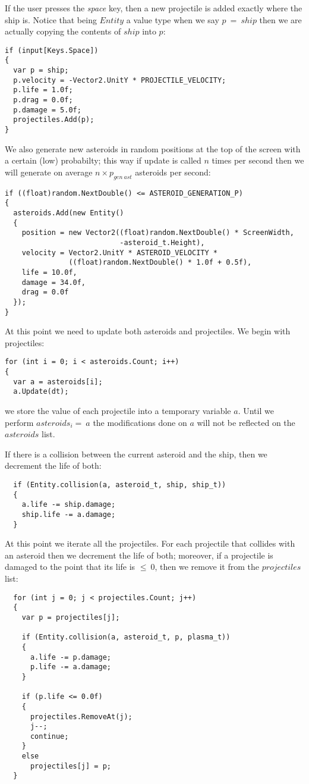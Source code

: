 If the user presses the \textit{space} key, then a new projectile is added exactly where the ship is. Notice that being $Entity$ a value type when we say $p\ =\ ship$ then we are actually copying the contents of $ship$ into $p$:
\begin{lstlisting}
if (input[Keys.Space])
{
  var p = ship;
  p.velocity = -Vector2.UnitY * PROJECTILE_VELOCITY;
  p.life = 1.0f;
  p.drag = 0.0f;
  p.damage = 5.0f;
  projectiles.Add(p);
}
\end{lstlisting}

We also generate new asteroids in random positions at the top of the screen with a certain (low) probabilty; this way if update is called $n$ times per second then we will generate on average $n \times p_{gen\ ast}$ asteroids per second:
\begin{lstlisting}
if ((float)random.NextDouble() <= ASTEROID_GENERATION_P)
{
  asteroids.Add(new Entity()
  {
    position = new Vector2((float)random.NextDouble() * ScreenWidth, 
                           -asteroid_t.Height),
    velocity = Vector2.UnitY * ASTEROID_VELOCITY * 
               ((float)random.NextDouble() * 1.0f + 0.5f),
    life = 10.0f,
    damage = 34.0f,
    drag = 0.0f
  });
}
\end{lstlisting}

At this point we need to update both asteroids and projectiles. We begin with projectiles:
\begin{lstlisting}
for (int i = 0; i < asteroids.Count; i++)
{
  var a = asteroids[i];
  a.Update(dt);
\end{lstlisting}

we store the value of each projectile into a temporary variable $a$. Until we perform $asteroids_i =\ a$ the modifications done on $a$ will not be reflected on the $asteroids$ list.

If there is a collision between the current asteroid and the ship, then we decrement the life of both:
\begin{lstlisting}
  if (Entity.collision(a, asteroid_t, ship, ship_t))
  {
    a.life -= ship.damage;
    ship.life -= a.damage;
  }
\end{lstlisting}

At this point we iterate all the projectiles. For each projectile that collides with an asteroid then we decrement the life of both; moreover, if a projectile is damaged to the point that its life is $\leq\ 0$, then we remove it from the $projectiles$ list:
\begin{lstlisting}
  for (int j = 0; j < projectiles.Count; j++)
  {
    var p = projectiles[j];

    if (Entity.collision(a, asteroid_t, p, plasma_t))
    {
      a.life -= p.damage;
      p.life -= a.damage;
    }

    if (p.life <= 0.0f)
    {
      projectiles.RemoveAt(j);
      j--;
      continue;
    }
    else
      projectiles[j] = p;
  }
\end{lstlisting}

